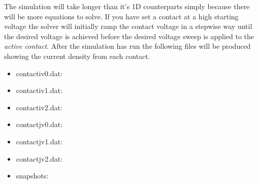 The simulation will take longer than it's 1D counterparts simply because there will be more equations to solve.  If you have set a contact at a high starting voltage the solver will initially ramp the contact voltage in a stepwise way until the desired voltage is achieved before the desired voltage sweep is applied to the \emph{active contact}. After the simulation has run the following files will be produced showing the current density from each contact.


\begin{itemize}
  \item contact\textunderscore iv0.dat:
  \item contact\textunderscore iv1.dat:
  \item contact\textunderscore iv2.dat:

  \item contact\textunderscore jv0.dat:
  \item contact\textunderscore jv1.dat:
  \item contact\textunderscore jv2.dat:

  \item snapshots:

\end{itemize}


